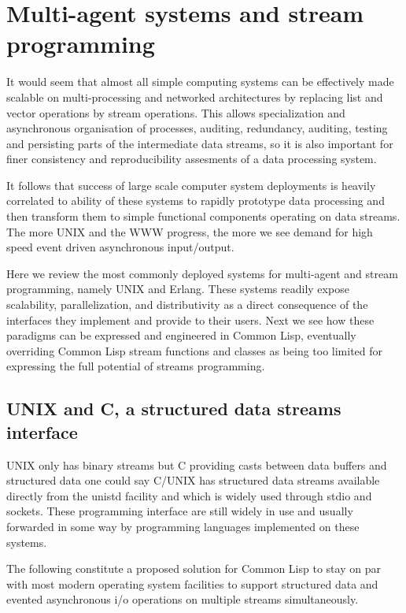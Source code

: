 \documentclass[sigconf]{acmart}
\begin{document}
\section{Multi-agent systems and stream programming}

It would seem that almost all simple computing systems can be effectively made scalable on multi-processing and networked architectures by replacing list and vector operations by stream operations. This allows specialization and asynchronous organisation of processes, auditing, redundancy, auditing, testing and persisting parts of the intermediate data streams, so it is also important for finer consistency and reproducibility assesments of a data processing system.

It follows that success of large scale computer system deployments is heavily correlated to ability of these systems to rapidly prototype data processing and then transform them to simple functional components operating on data streams. The more UNIX and the WWW progress, the more we see demand for high speed event driven asynchronous input/output.

Here we review the most commonly deployed systems for multi-agent and stream programming, namely UNIX and Erlang. These systems readily expose scalability, parallelization, and distributivity as a direct consequence of the interfaces they implement and provide to their users. Next we see how these paradigms can be expressed and engineered in Common Lisp, eventually overriding Common Lisp stream functions and classes as being too limited for expressing the full potential of streams programming.

\subsection{UNIX and C, a structured data streams interface}
UNIX only has binary streams but C providing casts between data buffers and structured data one could say C/UNIX has structured data streams available directly from the unistd facility and which is widely used through stdio and sockets. These programming interface are still widely in use and usually forwarded in some way by programming languages implemented on these systems.

The following constitute a proposed solution for Common Lisp to stay on par with most modern operating system facilities to support structured data and evented asynchronous i/o operations on multiple streams simultaneously.
\end{document}
